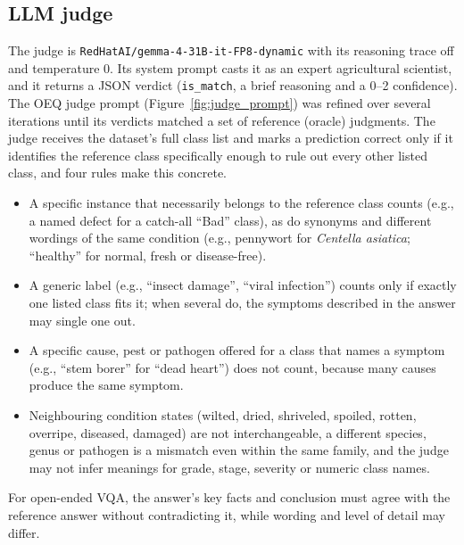 \documentclass[10pt,letterpaper]{article}
\newcommand{\code}[1]{\texttt{#1}}
\begin{document}
\subsection{LLM judge}
\label{app:judge}
The judge is \texttt{\nolinkurl{RedHatAI/gemma-4-31B-it-FP8-dynamic}} with its reasoning trace off and temperature 0. Its system prompt casts it as an expert agricultural scientist, and it returns a JSON verdict (\code{is\_match}, a brief reasoning and a 0--2 confidence). The OEQ judge prompt (Figure~\ref{fig:judge_prompt}) was refined over several iterations until its verdicts matched a set of reference (oracle) judgments. The judge receives the dataset's full class list and marks a prediction correct only if it identifies the reference class specifically enough to rule out every other listed class, and four rules make this concrete.
\begin{itemize}
    \item A specific instance that necessarily belongs to the reference class counts (e.g., a named defect for a catch-all ``Bad'' class), as do synonyms and different wordings of the same condition (e.g., pennywort for \emph{Centella asiatica}; ``healthy'' for normal, fresh or disease-free).
    \item A generic label (e.g., ``insect damage'', ``viral infection'') counts only if exactly one listed class fits it; when several do, the symptoms described in the answer may single one out.
    \item A specific cause, pest or pathogen offered for a class that names a symptom (e.g., ``stem borer'' for ``dead heart'') does not count, because many causes produce the same symptom.
    \item Neighbouring condition states (wilted, dried, shriveled, spoiled, rotten, overripe, diseased, damaged) are not interchangeable, a different species, genus or pathogen is a mismatch even within the same family, and the judge may not infer meanings for grade, stage, severity or numeric class names.
\end{itemize}
For open-ended VQA, the answer's key facts and conclusion must agree with the reference answer without contradicting it, while wording and level of detail may differ.
\end{document}
